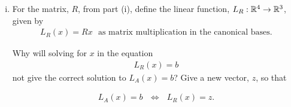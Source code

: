 \begin{question}
\begin{enumerate}[(i)]
        \item For the matrix, $R$, from part (i), define the linear function, $L_R:{\mathbb R}^4\to{\mathbb R}^3$, given by
              \begin{align*}
                  L_R(x) = Rx\ \ \ \text{as matrix multiplication in the canonical bases}.
              \end{align*}

              Why will solving for $x$ in the equation
              \begin{align*}
                  L_R(x)=b
              \end{align*}
              not give the correct solution to $L_A(x)=b$?  Give a new vector, $z$, so that

              \begin{align*}
                  L_A(x)=b\ \ \ \iff\ \ \ L_R(x)=z.
              \end{align*}
    \end{enumerate}


\end{question}